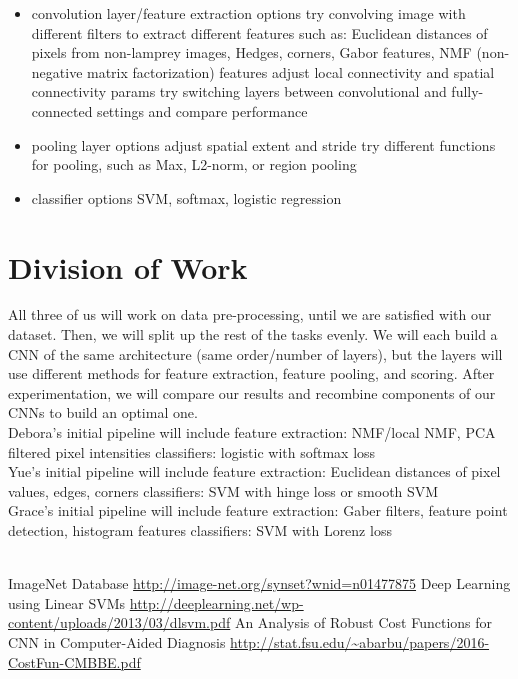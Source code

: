 \documentclass[10pt,letterpaper]{article}
\begin{document}
\begin{itemize}
\item convolution layer/feature extraction options
\subitem try convolving image with different filters to extract different features such as: Euclidean distances of pixels from non-lamprey images, Hedges, corners, Gabor features, NMF (non-negative matrix factorization) features
\subitem adjust local connectivity and spatial connectivity params
\subitem try switching layers between convolutional and fully-connected settings and compare performance
\item pooling layer options
\subitem adjust spatial extent and stride
\subitem try different functions for pooling, such as Max, L2-norm, or region pooling 
\item classifier options 
\subitem SVM, softmax, logistic regression
\end{itemize}

\section{Division of Work}
All three of us will work on data pre-processing, until we are satisfied with our dataset. Then, we will split up the rest of the tasks evenly. We will each build a CNN of the same architecture (same order/number of layers), but the layers will use different methods for feature extraction, feature pooling, and scoring. After experimentation, we will compare our results and recombine components of our CNNs to build an optimal one. \\

\noindent Debora's initial pipeline will include
\subitem feature extraction: NMF/local NMF, PCA filtered pixel intensities
\subitem classifiers: logistic with softmax loss \\

\noindent Yue's initial pipeline will include
\subitem feature extraction: Euclidean distances of pixel values, edges, corners
\subitem classifiers: SVM with hinge loss or smooth SVM \\

\noindent Grace's initial pipeline will include
\subitem feature extraction: Gaber filters, feature point detection, histogram features
\subitem classifiers: SVM with Lorenz loss \\

\
\begin{thebibliography}{1}
 ImageNet Database \url{http://image-net.org/synset?wnid=n01477875}
\bibitem{svms} Deep Learning using Linear SVMs \url{http://deeplearning.net/wp-content/uploads/2013/03/dlsvm.pdf}
\bibitem{costfxns} An Analysis of Robust Cost Functions for CNN in Computer-Aided Diagnosis \url{http://stat.fsu.edu/~abarbu/papers/2016-CostFun-CMBBE.pdf}
\end{thebibliography}
\end{document}
